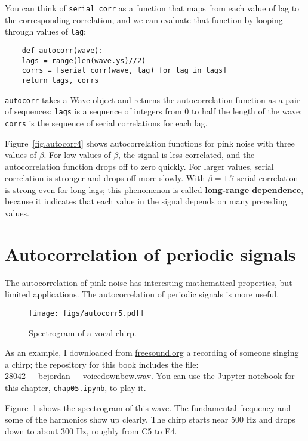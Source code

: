 You can think of \verb"serial_corr" as a function that
maps from each value of lag to the corresponding correlation, and we
can evaluate that function by looping through values of {\tt lag}:

\begin{verbatim}
	def autocorr(wave):
	lags = range(len(wave.ys)//2)
	corrs = [serial_corr(wave, lag) for lag in lags]
	return lags, corrs
\end{verbatim}

{\tt autocorr} takes a Wave object and returns the autocorrelation
function as a pair of sequences: {\tt lags} is a sequence of
integers from 0 to half the length of the wave; {\tt corrs}
is the sequence of serial correlations for each lag.

Figure~\ref{fig.autocorr4} shows autocorrelation functions for pink
noise with three values of $\beta$.  For low values of $\beta$, the
signal is less correlated, and the autocorrelation function drops
off to zero quickly.  For larger values, serial correlation
is stronger and drops off more slowly.  With $\beta=1.7$ serial
correlation is strong even for long lags; this phenomenon is called
{\bf long-range dependence}, because it indicates that each value in
the signal depends on many preceding values.


\section{Autocorrelation of periodic signals}

The autocorrelation of pink noise has interesting mathematical
properties, but limited applications.  The autocorrelation of
periodic signals is more useful.

\begin{figure}
	\centerline{\texttt{[image: figs/autocorr5.pdf]}}
	\caption{Spectrogram of a vocal chirp.}
	\label{fig.autocorr5}
\end{figure}

As an example, I downloaded from \url{freesound.org} a recording of
someone singing a chirp; the repository for this book includes the
file: \url{28042__bcjordan__voicedownbew.wav}.  You can use the
Jupyter notebook for this chapter, {\tt chap05.ipynb}, to play it.

Figure~\ref{fig.autocorr5} shows the spectrogram of this wave.
The fundamental frequency and some of the harmonics show up clearly.
The chirp starts near 500 Hz and drops down to about 300 Hz, roughly
from C5 to E4.

